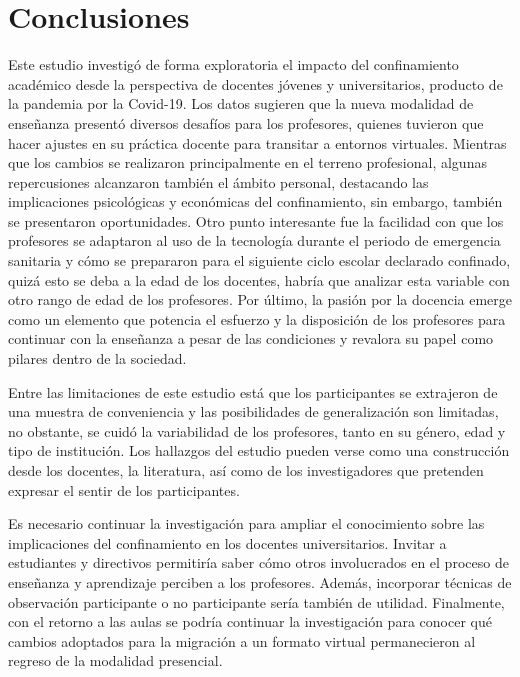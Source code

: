 \documentclass[spanish]{textolivre}
\begin{document}
\section{Conclusiones}

Este estudio investigó de forma exploratoria el impacto del confinamiento académico desde la perspectiva de docentes jóvenes y universitarios, producto de la pandemia por la Covid-19. Los datos sugieren que la nueva modalidad de enseñanza presentó diversos desafíos para los profesores, quienes tuvieron que hacer ajustes en su práctica docente para transitar a entornos virtuales. Mientras que los cambios se realizaron principalmente en el terreno profesional, algunas repercusiones alcanzaron también el ámbito personal, destacando las implicaciones psicológicas y económicas del confinamiento, sin embargo, también se presentaron oportunidades. Otro punto interesante fue la facilidad con que los profesores se adaptaron al uso de la tecnología durante el periodo de emergencia sanitaria y cómo se prepararon para el siguiente ciclo escolar declarado confinado, quizá esto se deba a la edad de los docentes, habría que analizar esta variable con otro rango de edad de los profesores. Por último, la pasión por la docencia emerge como un elemento que potencia el esfuerzo y la disposición de los profesores para continuar con la enseñanza a pesar de las condiciones y revalora su papel como pilares dentro de la sociedad. 

Entre las limitaciones de este estudio está que los participantes se extrajeron de una muestra de conveniencia y las posibilidades de generalización son limitadas, no obstante, se cuidó la variabilidad de los profesores, tanto en su género, edad y tipo de institución. Los hallazgos del estudio pueden verse como una construcción desde los docentes, la literatura, así como de los investigadores que pretenden expresar el sentir de los participantes.

Es necesario continuar la investigación para ampliar el conocimiento sobre las implicaciones del confinamiento en los docentes universitarios. Invitar a estudiantes y directivos permitiría saber cómo otros involucrados en el proceso de enseñanza y aprendizaje perciben a los profesores. Además, incorporar técnicas de observación participante o no participante sería también de utilidad. Finalmente, con el retorno a las aulas se podría continuar la investigación para conocer qué cambios adoptados para la migración a un formato virtual permanecieron al regreso de la modalidad presencial.
\end{document}
